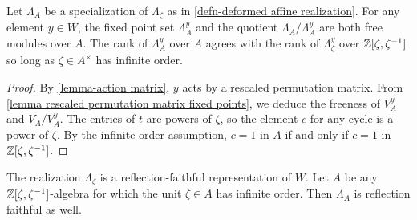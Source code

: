 \begin{lemma}\label{lemma freeness zeta infinite order} Let $\Lambda_A$ be a specialization of $\Lambda_{\zeta}$ as in \cref{defn-deformed affine realization}. For any element $y \in W$, the fixed point set $\Lambda_A^y$ and the quotient $\Lambda_A/\Lambda_A^y$ are both free modules over $A$.  The rank of $\Lambda_A^y$ over $A$ agrees with the rank of $\Lambda_{\zeta}^y$ over $\mathbb{Z}[\zeta, \zeta^{-1}]$ so long as $\zeta \in A^{\times}$ has infinite order. \end{lemma}

\begin{proof}
By \cref{lemma-action matrix}, $y$ acts by a rescaled permutation matrix. 
From \cref{lemma rescaled permutation matrix fixed points}, we deduce the freeness of $V_A^y$ and $V_A/V_A^y$. The entries of $t$ are powers of $\zeta$, so the element $c$ for any cycle is a power of $\zeta$. By the infinite order assumption, $c = 1$ in $A$ if and only if $c=1$ in $\mathbb{Z}[\zeta, \zeta^{-1}]$. \end{proof}




\begin{theorem}\label{reff thm} 
    The realization $\Lambda_{\zeta}$ is a reflection-faithful representation of $W$. 
    Let $A$ be any $\mathbb{Z}[\zeta, \zeta^{-1}]$-algebra for which the unit $\zeta \in A$ has infinite order. Then $\Lambda_A$ is reflection faithful as well.
    
\end{theorem}

